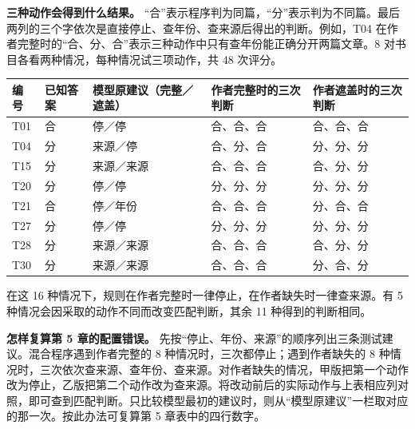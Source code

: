 \documentclass[UTF8,12pt,a4paper,fontset=none]{ctexart}
\begin{document}
\textbf{三种动作会得到什么结果。} “合”表示程序判为同篇，“分”表示判为不同篇。最后两列的三个字依次是直接停止、查年份、查来源后得出的判断。例如，T04 在作者完整时的“合、分、合”表示三种动作中只有查年份能正确分开两篇文章。8 对书目各看两种情况，每种情况试三项动作，共 48 次评分。\par

\begingroup\small\setlength{\tabcolsep}{3pt}\renewcommand{\arraystretch}{1.24}
\begin{longtable}{>{\raggedright\arraybackslash}p{0.11090\dimexpr\linewidth-10\tabcolsep\relax}>{\raggedright\arraybackslash}p{0.15084\dimexpr\linewidth-10\tabcolsep\relax}>{\raggedright\arraybackslash}p{0.26126\dimexpr\linewidth-10\tabcolsep\relax}>{\raggedright\arraybackslash}p{0.23850\dimexpr\linewidth-10\tabcolsep\relax}>{\raggedright\arraybackslash}p{0.23850\dimexpr\linewidth-10\tabcolsep\relax}}
\toprule
\textbf{编号} & \textbf{已知答案} & \textbf{模型原建议（完整／遮盖）} & \textbf{作者完整时的三次判断} & \textbf{作者遮盖时的三次判断} \\
\midrule
\endhead
T01 & 合 & 停／停 & 合、合、合 & 合、合、合 \\
T04 & 分 & 来源／停 & 合、分、合 & 分、分、分 \\
T15 & 分 & 来源／来源 & 合、合、合 & 合、分、分 \\
T20 & 分 & 停／停 & 分、分、分 & 分、分、分 \\
T21 & 合 & 停／年份 & 合、合、合 & 分、合、合 \\
T27 & 分 & 停／停 & 分、分、分 & 分、分、分 \\
T28 & 分 & 来源／来源 & 合、合、合 & 合、分、分 \\
T30 & 分 & 来源／来源 & 合、合、合 & 分、合、分 \\
\bottomrule
\end{longtable}\endgroup
在这 16 种情况下，规则在作者完整时一律停止，在作者缺失时一律查来源。有 5 种情况会因采取的动作不同而改变匹配判断，其余 11 种得到的判断相同。\par

\textbf{怎样复算第 5 章的配置错误。} 先按“停止、年份、来源”的顺序列出三条测试建议。混合程序遇到作者完整的 8 种情况时，三次都停止；遇到作者缺失的 8 种情况时，三次依次查来源、查年份、查来源。对作者缺失的情况，甲版把第一个动作改为停止，乙版把第二个动作改为查来源。将改动前后的实际动作与上表相应列对照，即可查到匹配判断。只比较模型最初的建议时，则从“模型原建议”一栏取对应的那一次。按此办法可复算第 5 章表中的四行数字。\par
\end{document}
